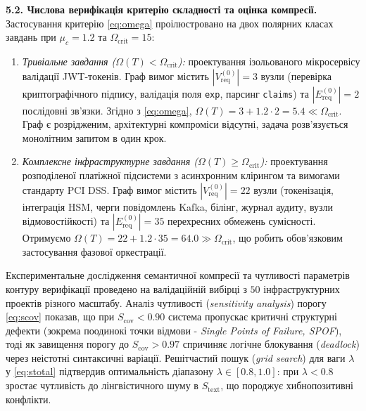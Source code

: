 \documentclass[12pt, reqno, a4paper]{amsart}
\theoremstyle{definition}
\theoremstyle{plain}
\theoremstyle{plain}
\theoremstyle{plain}
\theoremstyle{remark}
\theoremstyle{plain}
\begin{document}
{\textbf{5.2. Числова верифікація критерію складності та оцінка компресії.} Застосування критерію \eqref{eq:omega} проілюстровано на двох полярних класах завдань при $\mu_c = 1.2$ та $\Omega_{\text{crit}} = 15$:
\begin{enumerate}
\item \textit{Тривіальне завдання ($\Omega(T) < \Omega_{\text{crit}}$):} проектування ізольованого мікросервісу валідації JWT-токенів. Граф вимог містить $|V_{\text{req}}^{(0)}| = 3$ вузли (перевірка криптографічного підпису, валідація поля \texttt{exp}, парсинг \texttt{claims}) та $|E_{\text{req}}^{(0)}| = 2$ послідовні зв'язки. Згідно з \eqref{eq:omega}, $\Omega(T) = 3 + 1.2 \cdot 2 = 5.4 \ll \Omega_{\text{crit}}$. Граф є розрідженим, архітектурні компроміси відсутні, задача розв'язується монолітним запитом в один крок.
\item \textit{Комплексне інфраструктурне завдання ($\Omega(T) \ge \Omega_{\text{crit}}$):} проектування розподіленої платіжної підсистеми з асинхронним клірингом та вимогами стандарту PCI DSS. Граф вимог містить $|V_{\text{req}}^{(0)}| = 22$ вузли (токенізація, інтеграція HSM, черги повідомлень Kafka, білінг, журнал аудиту, вузли відмовостійкості) та $|E_{\text{req}}^{(0)}| = 35$ перехресних обмежень сумісності. Отримуємо $\Omega(T) = 22 + 1.2 \cdot 35 = 64.0 \gg \Omega_{\text{crit}}$, що робить обов'язковим застосування фазової оркестрації.
\end{enumerate}

Експериментальне дослідження семантичної компресії та чутливості параметрів контуру верифікації проведено на валідаційній вибірці з $50$ інфраструктурних проектів різного масштабу. Аналіз чутливості (\textit{sensitivity analysis}) порогу \eqref{eq:scov} показав, що при $S_{\text{cov}} < 0.90$ система пропускає критичні структурні дефекти (зокрема поодинокі точки відмови - \textit{Single Points of Failure, SPOF}), тоді як завищення порогу до $S_{\text{cov}} > 0.97$ спричиняє логічне блокування (\textit{deadlock}) через неістотні синтаксичні варіації. Решітчастий пошук (\textit{grid search}) для ваги $\lambda$ у \eqref{eq:stotal} підтвердив оптимальність діапазону $\lambda \in [0.8, 1.0]$: при $\lambda < 0.8$ зростає чутливість до лінгвістичного шуму в $S_{\text{text}}$, що породжує хибнопозитивні конфлікти.

}
\end{document}
